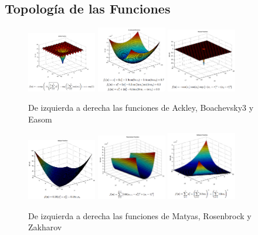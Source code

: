 \documentclass{article}
\begin{document}
\subsection{Topología de las Funciones}
\begin{figure}[h]
\centering
\includegraphics[width=0.27\textwidth]{../imagenes/ackley}
\includegraphics[width=0.27\textwidth]{../imagenes/boachevsky3}
\includegraphics[width=0.27\textwidth]{../imagenes/easom}
\caption{De izquierda a derecha las funciones de Ackley, Boachevsky3 y Easom}
\end{figure}
\begin{figure}[ht]
\centering
\includegraphics[width=0.27\textwidth]{../imagenes/matyas}
\includegraphics[width=0.27\textwidth]{../imagenes/rosenbrock}
\includegraphics[width=0.27\textwidth]{../imagenes/zakharov}
\caption{De izquierda a derecha las funciones de Matyas, Rosenbrock y Zakharov}
\end{figure}
\end{document}
